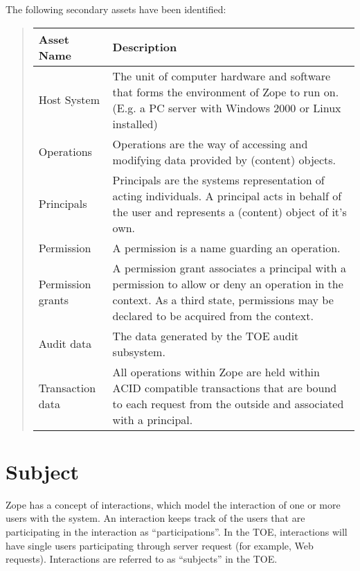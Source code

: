 \documentclass[10pt,a4paper,english]{scrbook}
\begin{document}
The following secondary assets have been identified:
\begin{quote}

\begin{longtable}[c]{|l|l|}
\hline
\textbf{
Asset Name
} & \textbf{
Description
} \\
\hline
\endhead

Host System
 & 
The unit of computer hardware and software that
forms the environment of Zope to run on. (E.g.
a PC server with Windows 2000 or Linux installed)
 \\
\hline

Operations
 & 
Operations are the way of accessing and modifying
data provided by (content) objects.
 \\
\hline

Principals
 & 
Principals are the systems representation of acting
individuals. A principal acts in behalf of the user
and represents a (content) object of it's own.
 \\
\hline

Permission
 & 
A permission is a name guarding an operation.
 \\
\hline

Permission grants
 & 
A permission grant associates a principal with a
permission to allow or deny an operation in the context.
As a third state, permissions may be declared to
be acquired from the context.
 \\
\hline

Audit data
 & 
The data generated by the TOE audit subsystem.
 \\
\hline

Transaction data
 & 
All operations within Zope are held within ACID
compatible transactions that are bound to each
request from the outside and associated with a
principal.
 \\
\hline
\end{longtable}
\end{quote}



\hypertarget{subject}{}
\section{Subject}

Zope has a concept of interactions, which model the interaction of one
or more users with the system.  An interaction keeps track of the
users that are participating in the interaction as ``participations''.
In the TOE, interactions will have single users participating through
server request (for example, Web requests).  Interactions are referred
to as ``subjects'' in the TOE.
\end{document}

